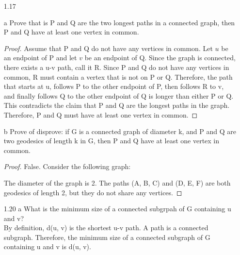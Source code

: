 \documentclass[12pt]{article}
\begin{document}
\begin{enumerate}
\item[1.17]
\item[a] Prove that is P and Q are the two longest paths in a connected graph, then P and Q have at least one vertex in common.
\begin{proof}
Assume that P and Q do not have any vertices in common.  Let $u$ be an endpoint of P and let $v$ be an endpoint of Q.  Since the graph is connected, there exists a u-v path, call it R. 
 Since P and Q do not have any vertices in common, R must contain a vertex that is not on P or Q.  Therefore, the path that starts at u, follows P to the other endpoint of P, then follows R to v, and finally follows Q to the other endpoint of Q is longer than either P or Q.  
 This contradicts the claim that P and Q are the longest paths in the graph.  Therefore, P and Q must have at least one vertex in common.
\end{proof}

\item[b] Prove of disprove: if G is a connected graph of diameter k, and P and Q are two geodesics of length k in G, then P and Q have at least one vertex in common.
\begin{proof}
False.  Consider the following graph:
\begin{center}
\end{center}
\noindent
The diameter of the graph is 2.  The paths (A, B, C) and (D, E, F) are both geodesics of length 2, but they do not share any vertices.
\end{proof}

\item[1.20 a] What is the minimum size of a connected subgrpah of G containing u and v? 
\\
\noindent
By definition, d(u, v) is the shortest u-v path. A path is
a connected subgraph. Therefore, the minimum size of a connected subgraph of G containing u and v is 
d(u, v).



\end{enumerate}
\end{document}
